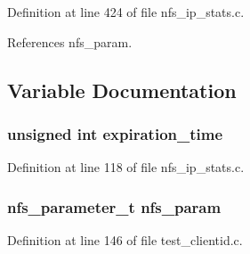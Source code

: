 Definition at line 424 of file nfs\_\-ip\_\-stats.c.

References nfs\_\-param.

\subsection{Variable Documentation}
\subsubsection{\setlength{\rightskip}{0pt plus 5cm}unsigned int {\bf expiration\_\-time}}\label{nfs__ip__stats_8c_a1}




Definition at line 118 of file nfs\_\-ip\_\-stats.c.
\subsubsection{\setlength{\rightskip}{0pt plus 5cm}nfs\_\-parameter\_\-t {\bf nfs\_\-param}}\label{nfs__ip__stats_8c_a0}




Definition at line 146 of file test\_\-clientid.c.